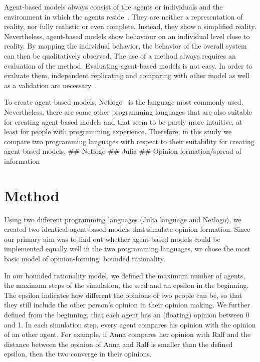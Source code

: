 \documentclass[runningheads]{llncs}
\begin{document}
Agent-based models always consist of the agents or individuals and the
environment in which the agents
reside~\autocite{Bonabeau2002Agentbased}. They are neither a
representation of reality, nor fully realistic or even complete.
Instead, they show a simplified reality. Nevertheless, agent-based
models show behaviour on an individual level close to reality. By
mapping the individual behavior, the behavior of the overall system can
then be qualitatively observed. The use of a method always requires an
evaluation of the method. Evaluating agent-based models is not easy. In
order to evaluate them, independent replicating and comparing with other
model as well as a validation are necessary~\autocite{Rouchier2008}.

To create agent-based models, Netlogo~\autocite{Wilensky1999} is the
language most commonly used. Nevertheless, there are some other
programming languages that are also suitable for creating agent-based
models and that seem to be partly more intuitive, at least for people
with programming experience. Therefore, in this study we compare two
programming languages with respect to their suitability for creating
agent-based models. \#\# Netlogo \#\# Julia \#\# Opinion
formation/spread of information

\hypertarget{method}{%
\section{Method}\label{method}}

Using two different programming languages (Julia language and Netlogo),
we created two identical agent-based models that simulate opinion
formation. Since our primary aim was to find out whether agent-based
models could be implemented equally well in the two programming
languages, we chose the most basic model of opinion-forming: bounded
rationality.

In our bounded rationality model, we defined the maximum number of
agents, the maximum steps of the simulation, the seed and an epsilon in
the beginning. The epsilon indicates how different the opinions of two
people can be, so that they still include the other person's opinion in
their opinion making. We further defined from the beginning, that each
agent has an (floating) opinion between 0 and 1. In each simulation
step, every agent compares his opinion with the opinion of an other
agent. For example, if Anna compares her opinion with Ralf and the
distance between the opinion of Anna and Ralf is smaller than the
defined epsilon, then the two converge in their opinions.
\end{document}
